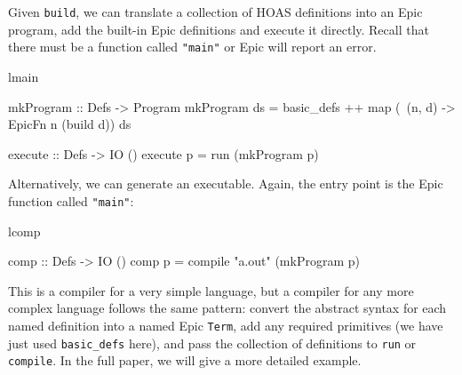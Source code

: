 \noindent
Given \texttt{build}, we can translate a collection of HOAS
definitions into an Epic program, add the built-in Epic definitions
and execute it directly. Recall that there must be a function called
\texttt{"main"} or Epic will report an error.

\begin{SaveVerbatim}{lmain}

mkProgram :: Defs -> Program
mkProgram ds = basic_defs ++ 
               map (\ (n, d) -> EpicFn n (build d)) ds

execute :: Defs -> IO ()
execute p = run (mkProgram p)

\end{SaveVerbatim}

\noindent
Alternatively, we can generate an executable. Again, the entry point
is the Epic function called \texttt{"main"}:

\begin{SaveVerbatim}{lcomp}

comp :: Defs -> IO ()
comp p = compile "a.out" (mkProgram p)

\end{SaveVerbatim}

\noindent
This is a compiler for a very simple language, but a compiler for any
more complex language follows the same pattern: convert the abstract
syntax for each named definition into a named Epic \texttt{Term}, add
any required primitives (we have just used \texttt{basic\_defs} here),
and pass the collection of definitions to \texttt{run} or
\texttt{compile}. In the full paper, we will give a more detailed
example.


